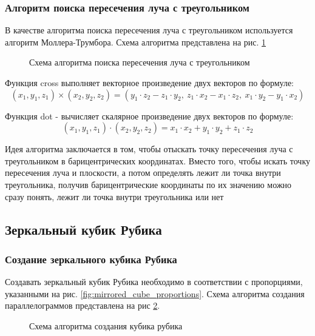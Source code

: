 \subsubsection{Алгоритм поиска пересечения луча с треугольником}
В качестве алгоритма поиска пересечения луча с треугольником используется алгоритм Моллера-Трумбора\cite{bib:mollertrumbor}. Схема алгоритма представлена на рис. \ref{fig:triangle_intersec}
\begin{figure}[!ht]
	\caption{Схема алгоритма поиска пересечения луча с треугольником}
	\label{fig:triangle_intersec}
\end{figure}

Функция cross выполняет векторное произведение двух векторов по формуле:
\begin{equation}
	(x_1, y_1, z_1)\times(x_2, y_2, z_2)=(y_1\cdot z_2-z_1\cdot y_2,~z_1\cdot x_2-x_1\cdot z_2,~x_1\cdot y_2-y_1\cdot x_2)
\end{equation}

Функция dot - вычисляет скалярное произведение двух векторов по формуле:
\begin{equation}
	(x_1, y_1, z_1)\cdot(x_2, y_2, z_2) = x_1\cdot x_2+y_1\cdot y_2+z_1\cdot z_2
\end{equation}

Идея алгоритма заключается в том, чтобы отыскать точку пересечения луча с треугольником в барицентрических координатах. Вместо того, чтобы искать точку пересечения луча и плоскости, а потом определять лежит ли точка внутри треугольника, получив барицентрические координаты по их значению можно сразу понять, лежит ли точка внутри треугольника или нет

\subsection{Зеркальный кубик Рубика}
\subsubsection{Создание зеркального кубика Рубика}
Создавать зеркальный кубик Рубика необходимо в соответствии с пропорциями, указанными на рис. \ref{fig:mirrored_cube_proportions}. Схема алгоритма создания параллелограммов представлена на рис \ref{fig:rubicks_create}.

\begin{figure}[!ht]
	\caption{Схема алгоритма создания кубика рубика}
	\label{fig:rubicks_create}
\end{figure}

